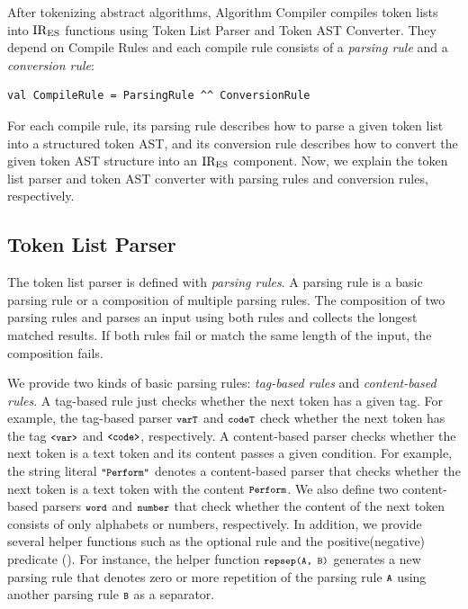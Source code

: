 After tokenizing abstract algorithms, {\sf Algorithm Compiler}
compiles token lists into \( \text{IR}_\text{ES} \) functions using
{\sf Token List Parser} and {\sf Token AST Converter}.
They depend on {\sf Compile Rules} and each compile rule
consists of a \textit{parsing rule} and a \textit{conversion rule}:
\begin{lstlisting}[style=myScalastyle]
val CompileRule = ParsingRule ^^ ConversionRule
\end{lstlisting}
For each compile rule, its parsing rule describes how to parse a given
token list into a structured token AST, and its conversion rule describes
how to convert the given token AST structure into an \( \text{IR}_\text{ES} \) component.
Now, we explain the token list parser and token AST converter with
parsing rules and conversion rules, respectively.


\subsection{Token List Parser}
The token list parser is defined with \textit{parsing rules}. A parsing rule
is a basic parsing rule or a composition of multiple parsing rules. The composition
 of two parsing rules  and  parses an input using
both rules and collects the longest matched results.  If both rules fail or
match the same length of the input, the composition fails.

We provide two kinds of basic parsing rules: \textit{tag-based rules} and
\textit{content-based rules}.  A tag-based rule just checks whether the next
token has a given tag.  For example, the tag-based parser \( \texttt{\footnotesize varT} \) and
\( \texttt{\footnotesize codeT} \) check whether the next token has the tag \( \texttt{\footnotesize<var>} \)
and \( \texttt{\footnotesize<code>} \), respectively.  A content-based parser checks whether
the next token is a text token and its content passes a given condition.  For
example, the string literal \( \texttt{\footnotesize"Perform"} \) denotes a content-based
parser that checks whether the next token is a text token with the content \(
\texttt{\footnotesize Perform} \).  We also define two content-based parsers \( \texttt{\footnotesize word} \)
and \( \texttt{\footnotesize number} \) that check whether the content of the next token
consists of only alphabets or numbers, respectively.  In addition, we provide
several helper functions such as the optional rule  and
the positive(negative) predicate ().  For instance, the helper
function \( \texttt{\footnotesize repsep(A, B)} \) generates a new parsing rule that denotes
zero or more repetition of the parsing rule \( \texttt{\footnotesize A} \) using another parsing
rule \( \texttt{\footnotesize B} \) as a separator.

